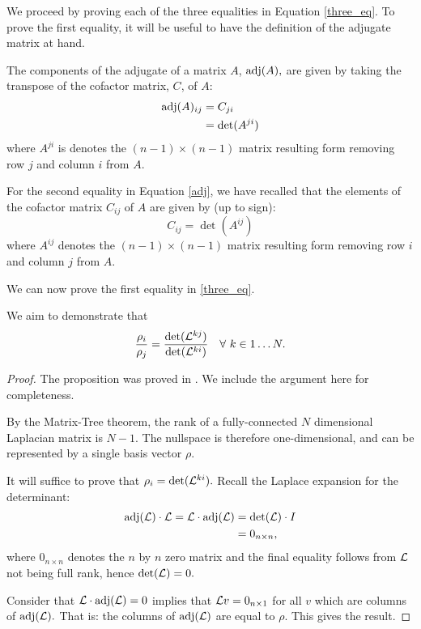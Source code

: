 We proceed by proving each of the three equalities in Equation \ref{three_eq}.  To prove the first equality, it will be useful to have the definition of the adjugate matrix at hand.

\begin{defn}{
The components of the adjugate of a matrix $A$, ${\rm adj}(A),$ are given by taking the transpose of the cofactor matrix, $C$, of $A$:
\begin{equation}\label{adj}
\begin{aligned}
{\rm adj}(A)_{ij} &= C_{ji}\\
&= \det(A^{ji})\\
\end{aligned}
\end{equation}
where $A^{ji}$ is denotes the $(n-1) \times (n-1)$ matrix resulting form removing row $j$ and column $i$ from $A.$

For the second equality in Equation \ref{adj}, we have recalled that the elements of the cofactor matrix $C_{ij}$ of $A$ are given by (up to sign):
\[
C_{ij} = \det(A^{ij})
\]
where $A^{ij}$ denotes the $(n-1) \times (n-1)$ matrix resulting form removing row $i$ and column $j$ from $A.$
}
\end{defn}

We can now prove the first equality in \ref{three_eq}.

\begin{prop}{ We aim to demonstrate that
\[
\frac{\rho_i}{\rho_j} = \frac{\det(\mathcal{L}^{kj})}{\det(\mathcal{L}^{ki})}  \ \ \ \forall \ k \in 1\ldots N.
\]
}
\begin{proof}
The proposition was proved in \cite{Mirzaev2013}.  We include the argument here for completeness.  

By the Matrix-Tree theorem, the rank of a fully-connected $N$ dimensional Laplacian matrix is $N-1.$  The nullspace is therefore one-dimensional, and can be represented by a single basis vector $\rho.$  

It will suffice to prove that $\rho_i = \det(\mathcal{L}^{ki}).$ Recall the Laplace expansion for the determinant:
\begin{equation}\label{expand}
\begin{aligned}
{\rm adj}(\mathcal{L})\cdot \mathcal{L} = \mathcal{L}\cdot {\rm adj}(\mathcal{L}) &= \det(\mathcal{L})\cdot I\\ 
&= 0_{n\times n},
\end{aligned}
\end{equation}
where $0_{n\times n}$ denotes the $n$ by $n$ zero matrix and the final equality follows from $\mathcal{L}$ not being full rank, hence $\det(\mathcal{L}) = 0.$

Consider that $\mathcal{L}\cdot {\rm adj}(\mathcal{L})=0$ implies that $\mathcal{L} v=0_{n\times 1}$ for all $v$ which are columns of ${\rm adj}(\mathcal{L}).$  That is: the columns of ${\rm adj}(\mathcal{L})$ are equal to $\rho.$  This gives the result.
\end{proof}
\end{prop}

